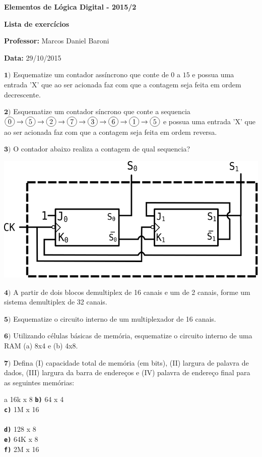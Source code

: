 \documentclass[12pt]{article}
\newcommand{\exerc}[3]{ \vspace*{25pt} {$\mathbf{#1)}$} #2 \hfill {\it #3} }
\newcommand{\exitem}[2]{ \texttt{\bf #1)} #2 \\ }
\newenvironment{exitems}[1]{
\\
\hspace*{30pt}
\begin{minipage}{0.8\textwidth}
\begin{multicols}{#1} 
}{
\end{multicols}
\end{minipage}
}
\newcommand*\circled[1]{\tikz[baseline=(char.base)]{
            \node[shape=circle,draw,inner sep=2pt] (char) {#1};}}
\begin{document}

\begin{center}
{\Large \bf Elementos de Lógica Digital - 2015/2}
\end{center}

{\large \bf Lista de exercícios}

{\bf Professor:} Marcos Daniel Baroni

{\bf Data:} 29/10/2015


\exerc{1}{Esquematize um contador assíncrono que conte de $0$ a $15$ e possua uma entrada 'X'
	que ao ser acionada faz com que a contagem seja feita em ordem decrescente.}{}

\exerc{2}{Esquematize um contador síncrono que conte a sequencia
	$\circled{0} \rightarrow
	\circled{5} \rightarrow
	\circled{2} \rightarrow
	\circled{7} \rightarrow
	\circled{3} \rightarrow
	\circled{6} \rightarrow
	\circled{1} \rightarrow \circled{5}$ e possua uma entrada 'X' que ao ser acionada faz com que a contagem
 	seja feita em ordem reversa.}{}

\exerc{3}{O contador abaixo realiza a contagem de qual sequencia?}{}
\begin{center}
  \includegraphics[scale=0.6]{cont1} \\ \vspace{15pt}
\end{center}

\exerc{4}{ A partir de dois blocos demultiplex de 16 canais e um de 2 canais, forme um sistema demultiplex de 32 canais.}{}

\exerc{5}{ Esquematize o circuito interno de um multiplexador de 16 canais.}{}

\exerc{6}{ Utilizando células básicas de memória, esquematize o circuito interno de uma RAM (a) 8x4 e (b) 4x8.}{}


\exerc{7}{Defina
(I) capacidade total de memória (em bits),
(II) largura de palavra de dados,
(III) largura da barra de endereços e
(IV) palavra de endereço final
para as seguintes memórias:}{}
\begin{exitems}{2}
	\exitem{a}{ 16k x 8 }
	\exitem{b}{ 64 x 4 }
	\exitem{c}{ 1M x 16 }
	\\
	\exitem{d}{ 128 x 8 }
	\exitem{e}{ 64K x 8 }
	\exitem{f}{ 2M x 16 }
\end{exitems}


\end{document}

